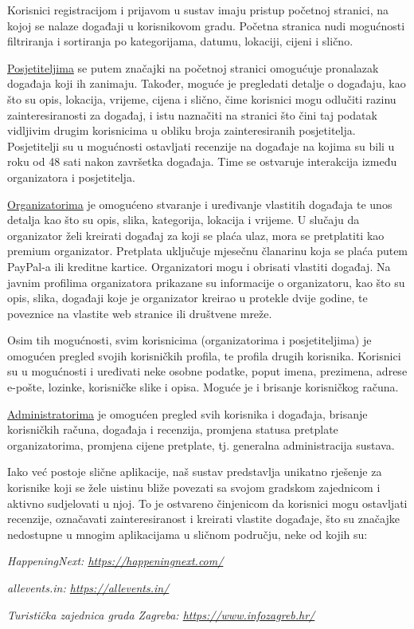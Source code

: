 		Korisnici registracijom i prijavom u sustav imaju pristup početnoj stranici, na kojoj se nalaze događaji u korisnikovom gradu. Početna stranica nudi mogućnosti filtriranja i sortiranja po kategorijama, datumu, lokaciji, cijeni i slično.

		\textit{}
		
		\underline{Posjetiteljima} se putem značajki na početnoj stranici omogućuje pronalazak događaja koji ih zanimaju. Također, moguće je pregledati detalje o događaju, kao što su opis, lokacija, vrijeme, cijena i slično, čime korisnici mogu odlučiti razinu zainteresiranosti za događaj, i istu naznačiti na stranici što čini taj podatak vidljivim drugim korisnicima u obliku broja zainteresiranih posjetitelja. Posjetitelji su u mogućnosti ostavljati recenzije na događaje na kojima su bili u roku od 48 sati nakon završetka događaja. Time se ostvaruje interakcija između organizatora i posjetitelja. 
		
		\underline{Organizatorima} je omogućeno stvaranje i uređivanje vlastitih događaja te unos detalja kao što su opis, slika, kategorija, lokacija i vrijeme. U slučaju da organizator želi kreirati događaj za koji se plaća ulaz, mora se pretplatiti kao premium organizator. Pretplata uključuje mjesečnu članarinu koja se plaća putem PayPal-a ili kreditne kartice. Organizatori mogu i obrisati vlastiti događaj. Na javnim profilima organizatora prikazane su informacije o organizatoru, kao što su opis, slika, događaji koje je organizator kreirao u protekle dvije godine, te poveznice na vlastite web stranice ili društvene mreže.

		Osim tih mogućnosti, svim korisnicima (organizatorima i posjetiteljima) je omogućen pregled svojih korisničkih profila, te profila drugih korisnika. Korisnici su u mogućnosti i uređivati neke osobne podatke, poput imena, prezimena, adrese e-pošte, lozinke, korisničke slike i opisa. Moguće je i brisanje korisničkog računa.

		\underline{Administratorima} je omogućen pregled svih korisnika i događaja, brisanje korisničkih računa, događaja i recenzija, promjena statusa pretplate organizatorima, promjena cijene pretplate, tj. generalna administracija sustava.

		\textit{}
		
		Iako već postoje slične aplikacije, naš sustav predstavlja unikatno rješenje za korisnike koji se žele uistinu bliže povezati sa svojom gradskom zajednicom i aktivno sudjelovati u njoj. To je ostvareno činjenicom da korisnici mogu ostavljati recenzije, označavati zainteresiranost i kreirati vlastite događaje, što su značajke nedostupne u mnogim aplikacijama u sličnom području, neke od kojih su:
		 \begin{packed_item}
			\item \textit{HappeningNext: \url{https://happeningnext.com/}}
			\item \textit{allevents.in: \url{https://allevents.in/}}
			\item \textit{Turistička zajednica grada Zagreba: \url{https://www.infozagreb.hr/}}
		 \end{packed_item}	

